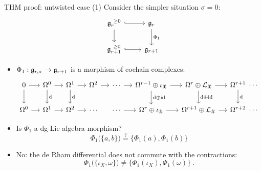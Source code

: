 \documentclass[beamer,10pt]{standalone}
\begin{document}
\begin{frame}{THM proof: untwisted case (1)}
	Consider the simpler situation $\sigma=0$:
	\begin{displaymath}
		\begin{tikzcd}[ampersand replacement=\&]
			\g_{r}^{~\geq 0} \ar[r,hook] \ar[d, ]
			\& \g_{r} \ar[d,"\Phi_1"]
			\\
			\g_{r+1}^{~\geq 0} \ar[r,hook] \& \g_{r+1}
		\end{tikzcd}
	\end{displaymath}
	\vfill \pause

	\begin{itemize}[<+-|@alert@+>]
		\item $\Phi_1:\mathfrak{g}_{r,\sigma}\to \mathfrak{g}_{r+1}$ is a morphism of cochain complexes:
		\begin{displaymath}
		\begin{tikzcd}[ampersand replacement=\&, column sep = small]
			0\ar[r]\ar[d] \&
			\Omega^0 \ar[r] \ar[d,"\d"] \&
			\Omega^1 \ar[r] \ar[d,"\d"] \&
			\Omega^2 \ar[r] \&
			\cdots \ar[r] \&
			\Omega^{r-1}\oplus \iota_{\X} \ar[d,"\d\oplus \id"] \ar[r] \&
			\Omega^{r}\oplus \Lie_{\X} \ar[r]\ar[d,"\d\oplus\id"] \&
			\Omega^{r+1} \ar[d,"\d"] \ar[r,phantom,"\cdots"] \& \phantom{.}
			\\
			\Omega^{0} \ar[r] \&
			\Omega^{1} \ar[r] \&
			\Omega^{2} \ar[r] \&
			\cdots \& \cdots \ar[r] \&
			\Omega^{r}\oplus\iota_{\X} \ar[r] \&
			\Omega^{r+1}\oplus \Lie_{\X} \ar[r] \&
			\Omega^{r+2} \ar[r,phantom,"\cdots"]  \& \phantom{.}
		\end{tikzcd}
		\end{displaymath}
		\vfill

		\item Is $\Phi_1$ a dg-Lie algebra morphism?
			$$ \Phi_1\big(\lbrace a, b \rbrace\big) \overset{?}{=} \big\lbrace \Phi_1(a), \Phi_1(b) \big\rbrace$$
		\vfill

		\item 	No: the de Rham differential does not commute with the contractions:
		$$ \Phi_1\big(\lbrace \iota_X, \omega \rbrace\big) \neq \big\lbrace \Phi_1(\iota_X), \Phi_1(\omega)\big\rbrace~.$$
	\end{itemize}
\end{frame}
\note[itemize]
{
	\item  
	\item 
}
\end{document}
